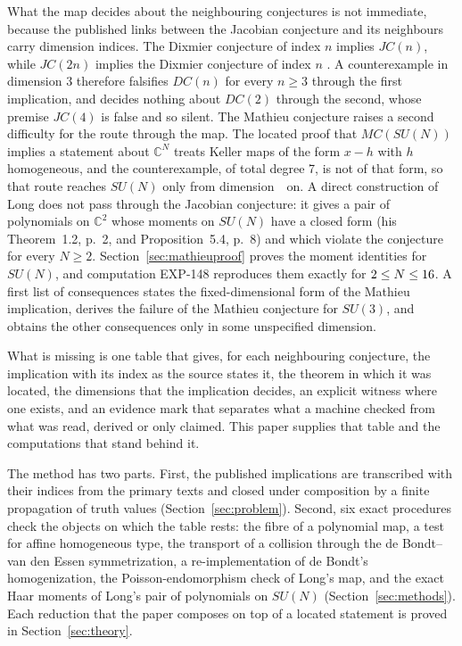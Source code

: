 \documentclass[11pt]{article}
\theoremstyle{remark}
\newcommand{\C}{\mathbb{C}}
\newcommand{\EXP}[1]{\mbox{EXP-#1}}
\begin{document}
What the map decides about the neighbouring conjectures is not immediate, because the published links between the Jacobian conjecture and its neighbours carry dimension indices. The Dixmier conjecture of index $n$ implies $JC(n)$, while $JC(2n)$ implies the Dixmier conjecture of index $n$ \cite[introduction and Theorem~1, p.~2]{BKK2007}. A counterexample in dimension 3 therefore falsifies $DC(n)$ for every $n\ge3$ through the first implication, and decides nothing about $DC(2)$ through the second, whose premise $JC(4)$ is false and so silent. The Mathieu conjecture raises a second difficulty for the route through the map. The located proof that $MC(SU(N))$ implies a statement about $\C^N$ treats Keller maps of the form $x-h$ with $h$ homogeneous, and the counterexample, of total degree 7, is not of that form, so that route reaches $SU(N)$ only from dimension~\nhomdim\ on. A direct construction of Long \cite{LongMathieu2026} does not pass through the Jacobian conjecture: it gives a pair of polynomials on $\C^2$ whose moments on $SU(N)$ have a closed form (his Theorem~1.2, p.~2, and Proposition~5.4, p.~8) and which violate the conjecture for every $N\ge2$. Section~\ref{sec:mathieuproof} proves the moment identities for $SU(N)$, and computation \EXP{148} reproduces them exactly for $2\le N\le16$. A first list of consequences \cite{Zhang2026} states the fixed-dimensional form of the Mathieu implication, derives the failure of the Mathieu conjecture for $SU(3)$, and obtains the other consequences only in some unspecified dimension.

What is missing is one table that gives, for each neighbouring conjecture, the implication with its index as the source states it, the theorem in which it was located, the dimensions that the implication decides, an explicit witness where one exists, and an evidence mark that separates what a machine checked from what was read, derived or only claimed. This paper supplies that table and the computations that stand behind it.

The method has two parts. First, the published implications are transcribed with their indices from the primary texts and closed under composition by a finite propagation of truth values (Section~\ref{sec:problem}). Second, six exact procedures check the objects on which the table rests: the fibre of a polynomial map, a test for affine homogeneous type, the transport of a collision through the de Bondt--van den Essen symmetrization, a re-implementation of de Bondt's homogenization, the Poisson-endomorphism check of Long's map, and the exact Haar moments of Long's pair of polynomials on $SU(N)$ (Section~\ref{sec:methods}). Each reduction that the paper composes on top of a located statement is proved in Section~\ref{sec:theory}.
\end{document}
